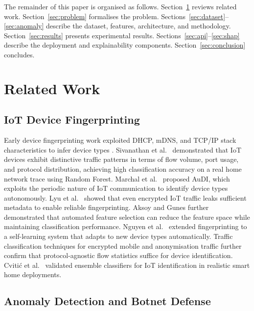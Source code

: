 \documentclass[conference]{IEEEtran}
\begin{document}
The remainder of this paper is organised as follows. Section~\ref{sec:related}
reviews related work. Section~\ref{sec:problem} formalises the problem.
Sections~\ref{sec:dataset}--\ref{sec:anomaly} describe the dataset, features,
architecture, and methodology. Section~\ref{sec:results} presents experimental
results. Sections~\ref{sec:api}--\ref{sec:shap} describe the deployment and
explainability components. Section~\ref{sec:conclusion} concludes.

\section{Related Work}
\label{sec:related}

\subsection{IoT Device Fingerprinting}

Early device fingerprinting work exploited DHCP, mDNS, and TCP/IP stack
characteristics to infer device types \cite{miettinen2017iotsentinel}.
Sivanathan et al.\ \cite{sivanathan2019classifying} demonstrated that IoT
devices exhibit distinctive traffic patterns in terms of flow volume, port
usage, and protocol distribution, achieving high classification accuracy on a
real home network trace using Random Forest. Marchal et al.\
\cite{marchal2019audi} proposed AuDI, which exploits the periodic nature of
IoT communication to identify device types autonomously. Lyu et al.\
\cite{lyu2020your} showed that even encrypted IoT traffic leaks sufficient
metadata to enable reliable fingerprinting. Aksoy and Gunes
\cite{aksoy2019automated} further demonstrated that automated feature
selection can reduce the feature space while maintaining classification
performance. Nguyen et al.\ \cite{nguyen2019diot} extended fingerprinting
to a self-learning system that adapts to new device types automatically.
Traffic classification techniques for encrypted mobile and anonymisation
traffic \cite{aceto2019mimetic,habibi2017characterization} further confirm
that protocol-agnostic flow statistics suffice for device identification.
Cviti\'{c} et al.\ \cite{cvitic2021ensemble} validated ensemble classifiers
for IoT identification in realistic smart home deployments.

\subsection{Anomaly Detection and Botnet Defense}
\end{document}
